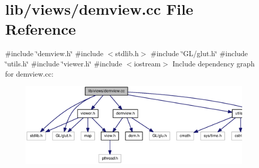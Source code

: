 \section{lib/views/demview.cc \-File \-Reference}
\label{demview_8cc}
{\ttfamily \#include \char`\"{}demview.\-h\char`\"{}}\*
{\ttfamily \#include $<$stdlib.\-h$>$}\*
{\ttfamily \#include \char`\"{}\-G\-L/glut.\-h\char`\"{}}\*
{\ttfamily \#include \char`\"{}utils.\-h\char`\"{}}\*
{\ttfamily \#include \char`\"{}viewer.\-h\char`\"{}}\*
{\ttfamily \#include $<$iostream$>$}\*
\-Include dependency graph for demview.\-cc\-:
\nopagebreak
\begin{figure}[H]
\begin{center}
\leavevmode
\includegraphics[width=350pt]{demview_8cc__incl}
\end{center}
\end{figure}
